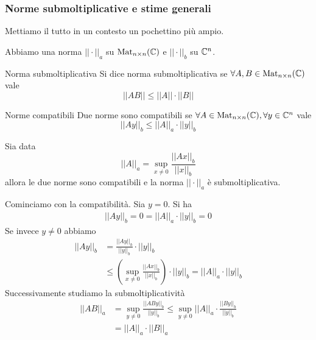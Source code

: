 \documentclass[a4paper]{article}
\begin{document}
\subsubsection{Norme submoltiplicative e stime generali}

Mettiamo il tutto in un contesto un pochettino più ampio.

Abbiamo una norma \(||\cdot||_a\) su \(\operatorname{Mat}_{n \times n}(\mathbb{C})\)
e \(||\cdot||_b\) su \(\mathbb{C}^n\).

\begin{snippetdefinition}{Norma submoltiplicativa}
    Si dice norma submoltiplicativa se \(\forall A,B \in \operatorname{Mat}_{n\times n}(\mathbb{C})\) vale
    \[
        ||AB|| \leq ||A|| \cdot ||B||
    \]
\end{snippetdefinition}

\begin{snippetdefinition}{Norme compatibili}
    Due norme sono compatibili se \(\forall A \in \operatorname{Mat}_{n \times n}(\mathbb{C}), \forall y \in \mathbb{C}^n\)
    vale
    \[
        ||Ay||_b \leq ||A||_a \cdot ||y||_b
    \]
\end{snippetdefinition}

\begin{snippetproposition}{}
    Sia data \[
        ||A||_a = \sup_{x \neq 0} \frac{||Ax||_b}{||x||_b}
    \]
    allora le due norme sono compatibili e la norma \(||\cdot||_a\) è submoltiplicativa.
\end{snippetproposition}

\begin{snippetproof}{}
    Cominciamo con la compatibilità.
    Sia \(y = 0\).
    Si ha
    \begin{align*}
        ||Ay||_b = 0 = ||A||_a \cdot ||y||_b = 0
    \end{align*}
    Se invece \(y\neq 0\) abbiamo
    \begin{align*}
        ||Ay||_b &= \frac{||Ay||_b}{||y||_b} \cdot ||y||_b \\
        &\leq \left(
            \sup_{x\neq 0} \frac{||Ax||_b}{||x||_b}
        \right) \cdot ||y||_b
        = ||A||_a \cdot ||y||_b
    \end{align*}
    Successivamente studiamo la submoltiplicatività
    \begin{align*}
        ||AB||_a &= \sup_{y\neq 0} \frac{||ABy||_b}{||y||_b}
        \leq \sup_{y\neq 0} ||A||_a \cdot \frac{||By||_b}{||y||_b} \\
        &= ||A||_a \cdot ||B||_a
    \end{align*}
\end{snippetproof}
\end{document}
